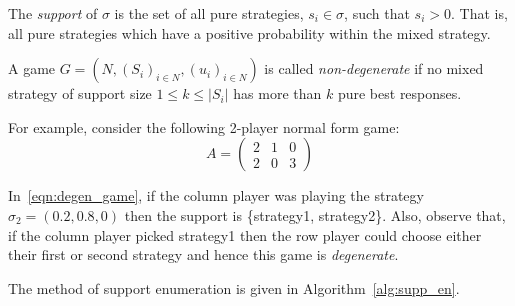 \newpage
\begin{definition}
    The \emph{support} of \(\sigma \) is the set of all pure strategies, \(s_{i}
    \in \sigma \), such that \(s_{i} > 0\). That is, all pure strategies which
    have a positive probability within the mixed strategy.
\end{definition}

\begin{definition}
    A game \(G = (N, {(S_{i})}_{i \in N}, {(u_{i})}_{i \in N})\)
    is called \emph{non-degenerate} if no mixed strategy of support size \(1 \le
    k \le |S_{i}|\) has more than \(k\) pure best responses.
\end{definition}\label{def:non_degen}

For example, consider the following 2-player normal form game:
\begin{equation}
        A = \begin{pmatrix}
                2 & 1 & 0\\
                2 & 0 & 3
        \end{pmatrix}
\end{equation}\label{eqn:degen_game}


In~\eqref{eqn:degen_game}, if the column player was playing the strategy \(\sigma_{2} = (0.2, 0.8,
0)\) then the support is \{strategy1, strategy2\}. Also, observe that, if the
column player picked strategy1 then the row player could choose either their
first or second strategy and hence this game is \textit{degenerate}. 

The method of support enumeration is given in Algorithm~\ref{alg:supp_en}.

